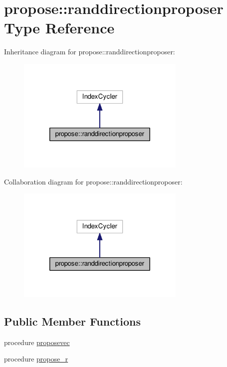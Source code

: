 \hypertarget{structpropose_1_1randdirectionproposer}{}\section{propose\+:\+:randdirectionproposer Type Reference}
\label{structpropose_1_1randdirectionproposer}


Inheritance diagram for propose\+:\+:randdirectionproposer\+:
\nopagebreak
\begin{figure}[H]
\begin{center}
\leavevmode
\includegraphics[width=228pt]{structpropose_1_1randdirectionproposer__inherit__graph}
\end{center}
\end{figure}


Collaboration diagram for propose\+:\+:randdirectionproposer\+:
\nopagebreak
\begin{figure}[H]
\begin{center}
\leavevmode
\includegraphics[width=228pt]{structpropose_1_1randdirectionproposer__coll__graph}
\end{center}
\end{figure}
\subsection*{Public Member Functions}
\begin{DoxyCompactItemize}
\item 
procedure \mbox{\hyperlink{structpropose_1_1randdirectionproposer_a1d9df745255cd310cd8c13533b35479f}{proposevec}}
\item 
procedure \mbox{\hyperlink{structpropose_1_1randdirectionproposer_af2a22e23a2ac8d6b7d6cdc4bbbc8a1d3}{propose\+\_\+r}}
\end{DoxyCompactItemize}
